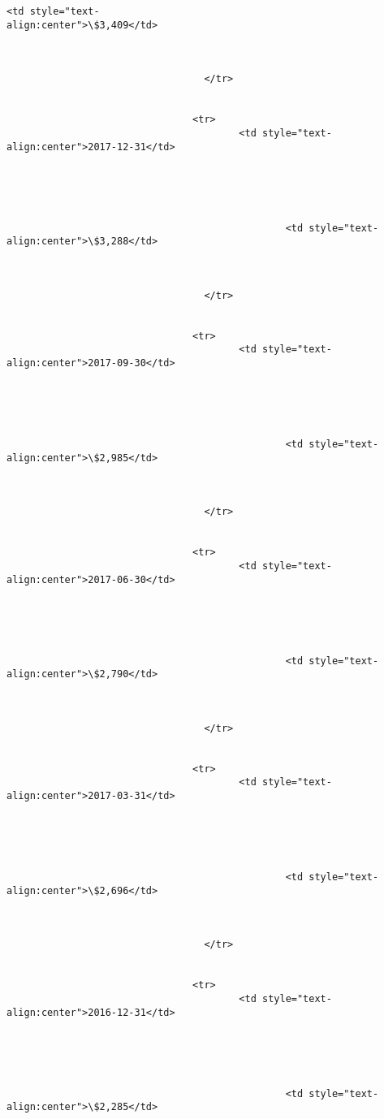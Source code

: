 \documentclass[11pt]{article}
\begin{document}
\begin{Verbatim}[commandchars=\\\{\}]
                                                <td style="text-
align:center">\$3,409</td>



                                  </tr>


                                <tr>
                                        <td style="text-
align:center">2017-12-31</td>





                                                <td style="text-
align:center">\$3,288</td>



                                  </tr>


                                <tr>
                                        <td style="text-
align:center">2017-09-30</td>





                                                <td style="text-
align:center">\$2,985</td>



                                  </tr>


                                <tr>
                                        <td style="text-
align:center">2017-06-30</td>





                                                <td style="text-
align:center">\$2,790</td>



                                  </tr>


                                <tr>
                                        <td style="text-
align:center">2017-03-31</td>





                                                <td style="text-
align:center">\$2,696</td>



                                  </tr>


                                <tr>
                                        <td style="text-
align:center">2016-12-31</td>





                                                <td style="text-
align:center">\$2,285</td>




\end{Verbatim}
\end{document}

